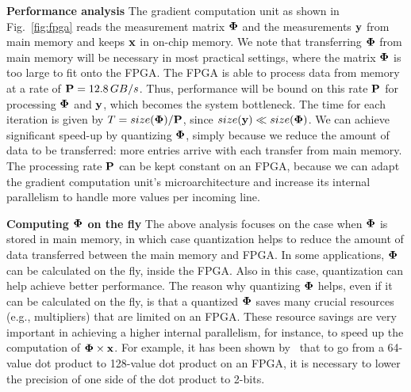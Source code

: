 \documentclass[aoas,preprint]{imsart}
\numberwithin{equation}{section}
\theoremstyle{plain}
\begin{document}
{\vspace{0.5em}
{\bf Performance analysis} The gradient computation unit as shown in Fig.~\ref{fig:fpga} reads the measurement matrix ${\bf \Phi}$ and the measurements ${\bf y}$ from main memory and keeps ${\bf x}$ in on-chip memory. 
We note that transferring ${\bf \Phi}$ from main memory will be necessary in most practical settings, where the matrix ${\bf \Phi}$ is too large to fit onto the FPGA. 
The FPGA is able to process data from memory at a rate of ${\bf P}=12.8\,GB/s$. 
Thus, performance will be bound on this rate ${\bf P}$ for processing ${\bf \Phi}$ and ${\bf y}$, which becomes the system bottleneck. The time for each iteration is given by 
$T = size({\bf \Phi})/{\bf P}$, since $size({\bf y}) \ll size({\bf \Phi})$. 
We can achieve significant speed-up by quantizing ${\bf \Phi}$, simply because we reduce the amount of data to be transferred: more entries arrive with each transfer from main memory. 
The processing rate ${\bf P}$ can be kept constant on an FPGA, because we can adapt the gradient computation unit's microarchitecture and increase its internal parallelism to handle more values per incoming line. 
\vspace{0.5em}

{\bf Computing ${\bf \Phi}$ on the fly} The above analysis focuses on the case when ${\bf \Phi}$ 
is stored in main memory, in which case quantization helps to reduce the amount of 
data transferred between the main memory and FPGA. In some applications, ${\bf \Phi}$
can be calculated on the fly, inside the FPGA. Also in this case, quantization can help 
achieve better performance.
The reason why quantizing ${\bf \Phi}$ helps, even if it can be calculated on the fly, is
that a quantized ${\bf \Phi}$ saves many crucial resources (e.g., multipliers) that
are limited on an FPGA. These resource savings are very important in achieving a higher 
internal parallelism, for instance, to speed up the computation of ${\bf \Phi}\times{\bf x}$. 
For example, it has been shown by~\cite{kara2017fpga} that to go from a 64-value dot product to 128-value
dot product on an FPGA, it is necessary to lower the precision of one side of the dot product to 2-bits.

}
\end{document}
